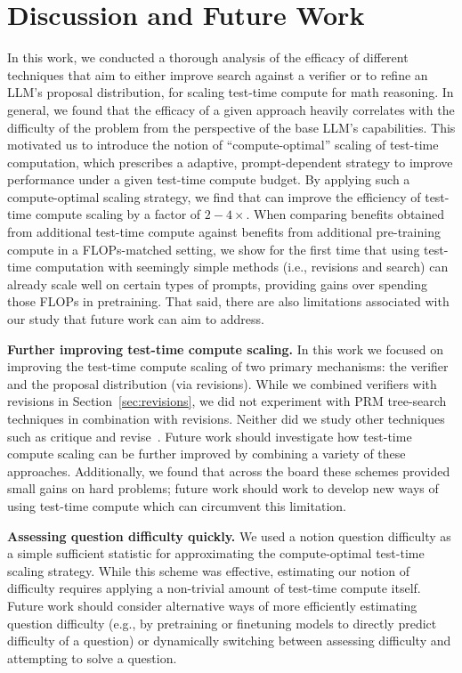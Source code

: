 \documentclass[11pt, letterpaper, logo]{googledeepmind}
\begin{document}
\vspace{-0.2cm}
\section{Discussion and Future Work}
\label{sec:discussion}
\vspace{-0.2cm}

In this work, we conducted a thorough analysis of the efficacy of different techniques that aim to either improve search against a verifier or to refine an LLM's proposal distribution, for scaling test-time compute for math reasoning. In general, we found that the efficacy of a given approach heavily correlates with the difficulty of the problem from the perspective of the base LLM's capabilities. This motivated us to introduce the notion of ``compute-optimal'' scaling of test-time computation, which prescribes a adaptive, prompt-dependent strategy to improve performance under a given test-time compute budget. By applying such a compute-optimal scaling strategy, we find that can improve the efficiency of test-time compute scaling by a factor of \textbf{$2-4\times$}. When comparing benefits obtained from additional test-time compute against benefits from additional pre-training compute in a FLOPs-matched setting, we show for the first time that using test-time computation with seemingly simple methods (i.e., revisions and search) can already scale well on certain types of prompts, providing gains over spending those FLOPs in pretraining. That said, there are also limitations associated with our study that future work can aim to address. 

\textbf{Further improving test-time compute scaling.} In this work we focused on improving the test-time compute scaling of two primary mechanisms: the verifier and the proposal distribution (via revisions). While we combined verifiers with revisions in Section~\ref{sec:revisions}, we did not experiment with PRM tree-search techniques in combination with revisions. Neither did we study other techniques such as critique and revise~\citep{madaan2023selfrefine}. Future work should investigate how test-time compute scaling can be further improved by combining a variety of these approaches. Additionally, we found that across the board these schemes provided small gains on hard problems; future work should work to develop new ways of using test-time compute which can circumvent this limitation.

\textbf{Assessing question difficulty quickly.} We used a notion question difficulty as a simple sufficient statistic for approximating the compute-optimal test-time scaling strategy. While this scheme was effective, estimating our notion of difficulty requires applying a non-trivial amount of test-time compute itself. Future work should consider alternative ways of more efficiently estimating question difficulty (e.g., by pretraining or finetuning models to directly predict difficulty of a question) or dynamically switching between assessing difficulty and attempting to solve a question.
\end{document}
